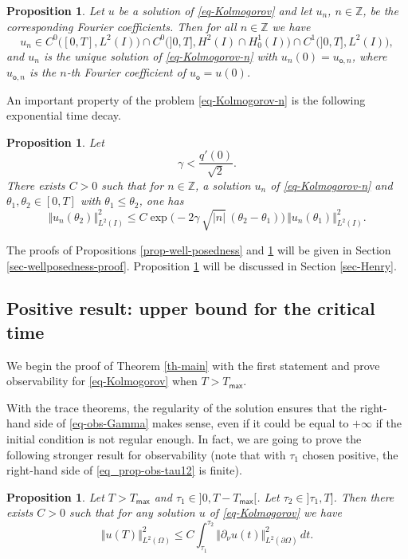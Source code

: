 \documentclass[10pt]{amsart}
\theoremstyle{plain}
\newtheorem{proposition}[theorem]{Proposition}
\theoremstyle{definition}
\newcommand{\abs}[1]{\vert #1\vert}
\newcommand{\nr}[1]{\Vert #1\Vert}
\newcommand{\1}{\mathds 1}
\newcommand{\Z}{\mathbb{Z}}
\let\th\theta
\let\O\Omega
\newcommand{\Tmax}{T_{\mathsf{max}}}
\newcommand{\uo}{u_{\mathsf{o}}}
\begin{document}
\begin{proposition} \label{prop-well-posedness-n}
Let $u$ be a solution of \eqref{eq-Kolmogorov} and let $u_n$, $n \in \Z$, be the corresponding Fourier coefficients. Then for all $n \in \Z$ we have
\[
u_n \in C^0 \bigl([0,T],L^2(I) \bigr) \cap C^0 \bigl(]0,T],H^2(I) \cap H^1_0(I) \bigr) \cap C^1 \bigl(]0,T], L^2(I) \bigr),
\]
and $u_n$ is the unique solution of \eqref{eq-Kolmogorov-n} with $u_n(0) = u_{\mathsf{o},n}$, where $u_{\mathsf{o},n}$ is the $n$-th Fourier coefficient of $\uo = u(0)$.
\end{proposition}

An important property of the problem \eqref{eq-Kolmogorov-n} is the following exponential time decay.

\begin{proposition} \label{prop-decay-expKn}
Let
\[
\gamma < \frac{q'(0)}{\sqrt{2}}.
\]
There exists $C>0$ such that for $n \in \Z$, a solution $u_n$ of \eqref{eq-Kolmogorov-n} and $\th_1,\th_2 \in [0,T]$ with $\th_1 \leq \th_2$, one has
\[
\nr{u_n(\th_2)}_{L^2(I)}^2 \leq C \exp \bigl(- 2 \gamma\,\sqrt{\abs n}\,(\th_2-\th_1)\bigr)\, \nr{u_n(\th_1)}_{L^2(I)}^2.
\]
\end{proposition}

The proofs of Propositions \ref{prop-well-posedness} and \ref{prop-well-posedness-n} will be given in Section \ref{sec-wellposedness-proof}. Proposition \ref{prop-decay-expKn} will be discussed in Section \ref{sec-Henry}.

\subsection{Positive result: upper bound for the critical time}

We begin the proof of Theorem \ref{th-main} with the first statement and prove observability for \eqref{eq-Kolmogorov} when $T > \Tmax$.

With the trace theorems, the regularity of the solution ensures that the right-hand side of \eqref{eq-obs-Gamma} makes sense, even if it could be equal to $+\infty$ if the initial condition is not regular enough. In fact, we are going to prove the following stronger result for observability (note that with $\tau_1$ chosen positive, the right-hand side of \eqref{eq_prop-obs-tau12} is finite).

\begin{proposition} \label{prop-obs-tau12}
Let $T > \Tmax$ and $\tau_1 \in{}]0,T-\Tmax[$. Let $\tau_2 \in{}]\tau_1,T]$. Then there exists $C > 0$ such that for any solution $u$ of \eqref{eq-Kolmogorov} we have
\begin{equation} \label{eq_prop-obs-tau12}
\nr{u(T)}_{L^2(\O)}^2 \leq C \int_{\tau_1}^{\tau_2} \nr{\partial_\nu u(t)}_{L^2(\partial \O)}^2 \, dt.
\end{equation}
\end{proposition}
\end{document}
